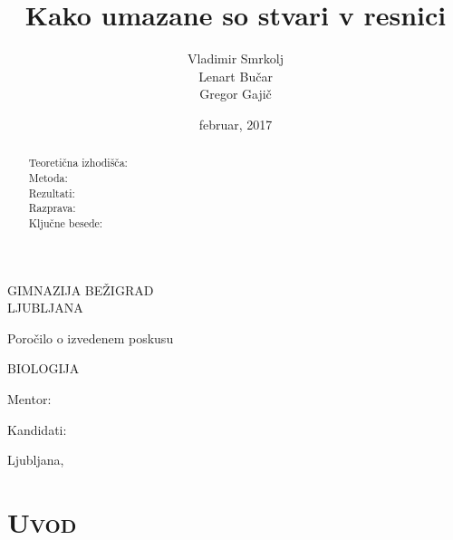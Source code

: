 \documentclass[12pt, a4paper]{report}
\begin{document}
\title{Kako umazane so stvari v resnici}
\author{Vladimir Smrkolj\\Lenart Bučar\\Gregor Gajič}
\date{februar, 2017}

\sffamily

\begin{titlepage}
\centering


{\Large{GIMNAZIJA BEŽIGRAD\\[2mm]LJUBLJANA}}

\vspace{3.5cm}

{\large Poročilo o izvedenem poskusu

\vspace{1cm}

BIOLOGIJA
}

\vspace{3.5cm}

\makeatletter
{\LARGE{\textbf{\@title}}}
\makeatother


\vfill


\parbox{4cm}{Mentor:}
\hfill
\makeatletter
Kandidati: \parbox[t]{3cm}{\@author}
\makeatother

\vspace{3cm}

\makeatletter
Ljubljana, \@date
\makeatother

\end{titlepage}


\begin{abstract}
\begin{description}

\item[Teoretična izhodišča:]

\item[Metoda:]

\item[Rezultati:]

\item[Razprava:]

\item[Ključne besede:]

\end{description}
\end{abstract}

\tableofcontents

\chapter{\textsc{Uvod}}
\end{document}
